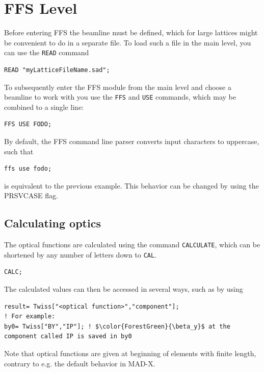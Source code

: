 \documentclass{article}
\begin{document}
\clearpage

\section{FFS Level}
Before entering FFS the beamline must be defined, which for large lattices might be convenient to do in a separate file. To load such a file in the main level, you can use the \texttt{READ} command
\begin{lstlisting}
READ "myLatticeFileName.sad";
\end{lstlisting}
To subsequently enter the FFS module from the main level and choose a beamline to work with you use the \texttt{FFS} and \texttt{USE} commands, which may be combined to a single line:
\begin{lstlisting}
FFS USE FODO;
\end{lstlisting}
By default, the FFS command line parser converts input characters to uppercase, such that 
\begin{lstlisting}
ffs use fodo;
\end{lstlisting}
is equivalent to the previous example. This behavior can be changed by using the PRSVCASE flag.

\subsection{Calculating optics}
The optical functions are calculated using the command \texttt{CALCULATE}, which can be shortened by any number of letters down to \texttt{CAL}.
\begin{lstlisting}
CALC;
\end{lstlisting}
 The calculated values can then be accessed in several ways, such as by using
\begin{lstlisting}[mathescape=True]
result= Twiss["<optical function>","component"];
! For example:
by0= Twiss["BY","IP"]; ! $\color{ForestGreen}{\beta_y}$ at the component called IP is saved in by0
\end{lstlisting}
Note that optical functions are given at beginning of elements with finite length, contrary to e.g. the default behavior in MAD-X.
\end{document}

